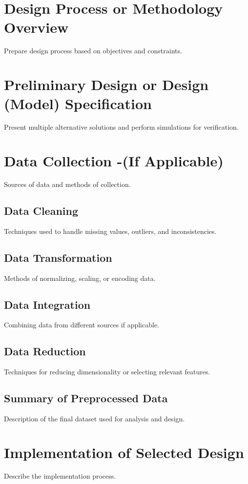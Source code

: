 \section{Design Process or Methodology Overview }
Prepare design process based on objectives and constraints.
\section{Preliminary Design or Design (Model) Specification}

Present multiple alternative solutions and perform simulations for verification.

\section{Data Collection -(If
Applicable)}
Sources of data and methods of collection.

\subsection{Data Cleaning}
Techniques used to handle missing values, outliers, and inconsistencies.

\subsection{Data Transformation}
Methods of normalizing, scaling, or encoding data.

\subsection{Data Integration}
Combining data from different sources if applicable.
\subsection{Data Reduction }
Techniques for reducing dimensionality or selecting relevant features.
\subsection{Summary of Preprocessed Data}
Description of the final dataset used for analysis and design.

\section{Implementation of Selected Design}
Describe the implementation process.